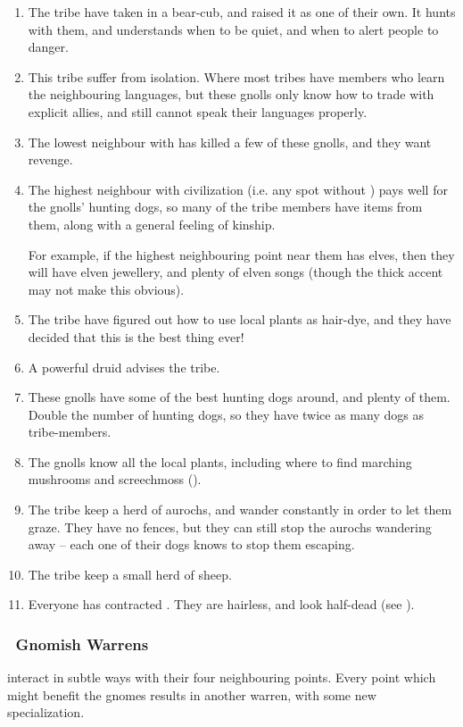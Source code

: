 \begin{multicols}{2}
\begin{enumerate}
  \item
  The tribe have taken in a bear-cub, and raised it as one of their own.
  It hunts with them, and understands when to be quiet, and when to alert people to danger.
  \item
  This tribe suffer from isolation.
  Where most tribes have members who learn the neighbouring languages, but these gnolls only know how to trade with explicit allies, and still cannot speak their languages properly.
  \item
  The lowest neighbour with  has killed a few of these gnolls, and they want revenge.
  \item
  The highest neighbour with civilization (i.e. any spot without ) pays well for the gnolls' hunting dogs, so many of the tribe members have items from them, along with a general feeling of kinship.

  For example, if the highest neighbouring point near them has elves, then they will have elven jewellery, and plenty of elven songs (though the thick accent may not make this obvious).
  \item
  The tribe have figured out how to use local plants as hair-dye, and they have decided that this is the best thing ever!
  \index[Dye]
  \item
  A powerful druid advises the tribe.
  \item
  These gnolls have some of the best hunting dogs around, and plenty of them.
  Double the number of hunting dogs, so they have twice as many dogs as tribe-members.
  \item
  The gnolls know all the local plants, including where to find marching mushrooms and screechmoss ().
  \item
  The tribe keep a herd of aurochs, and wander constantly in order to let them graze.
  They have no fences, but they can still stop the aurochs wandering away -- each one of their dogs knows to stop them escaping.
  \item
  The tribe keep a small herd of sheep.
  \item
  Everyone has contracted .
  They are hairless, and look half-dead
  (see ).
\end{enumerate}

\subsubsection[Gnomish Warrens]{\Gn\ Gnomish Warrens}
\label{gnomePoint}
interact in subtle ways with their four neighbouring points.
Every point which might benefit the gnomes results in another warren, with some new specialization.


\end{multicols}
